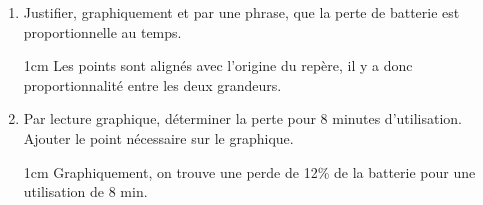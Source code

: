 \documentclass[a4paper]{book}
\begin{document}
{\begin{exercice}
\begin{enumerate}
\begin{center}
            \end{center}
            
            \item Justifier, graphiquement et par une phrase, que la perte de batterie est proportionnelle au temps.

            \begin{ZoneReponse}{1cm}
                Les points sont alignés avec l'origine du repère, il y a donc proportionnalité entre les deux grandeurs.
            \end{ZoneReponse}

            \item Par lecture graphique, déterminer la perte pour 8 minutes d'utilisation. Ajouter le point nécessaire sur le graphique.

            \begin{ZoneReponse}{1cm}
                Graphiquement, on trouve une perde de 12\% de la batterie pour une utilisation de 8 min.
            \end{ZoneReponse}
        \end{enumerate}
    \end{exercice}


}
\end{document}
